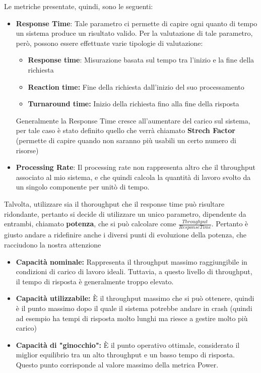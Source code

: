 Le metriche presentate, quindi, sono le seguenti:
\begin{itemize}
    \item \textbf{Response Time}: Tale parametro ci permette di capire ogni quanto di tempo un sistema produce un risultato valido. Per la valutazione di tale parametro, però, possono essere effettuate varie tipologie di valutazione:
    \begin{itemize}
        \item \textbf{Response time}: Misurazione basata sul tempo tra l'inizio e la fine della richiesta
            
        \item \textbf{Reaction time:} Fine della richiesta dall'inizio del suo processamento
        
        \item \textbf{Turnaround time:} Inizio della richiesta fino alla fine della risposta
    \end{itemize}

    Generalmente la Response Time cresce all'aumentare del carico sul sistema, per tale caso è stato definito quello che verrà chiamato \textbf{Strech Factor} (permette di capire quando non saranno più usabili un certo numero di risorse)

    \item \textbf{Processing Rate}: Il processing rate non rappresenta altro che il throughput associato al mio sistema, e che quindi calcola la quantità di lavoro svolto da un singolo componente per unitò di tempo.
\end{itemize}

Talvolta, utilizzare sia il thoroughput che il response time può risultare ridondante, pertanto si decide di utilizzare un unico parametro, dipendente da entrambi, chiamato \textbf{potenza}, che si può calcolare come \textbf{\(\frac{Throughput}{Response Time}\)}. Pertanto è giusto andare a ridefinire anche i diversi punti di evoluzione della potenza, che racciudono la nostra attenzione

\begin{itemize}
    \item \textbf{Capacità nominale:} Rappresenta il throughput massimo raggiungibile in condizioni di carico di lavoro ideali. Tuttavia, a questo livello di throughput, il tempo di risposta è generalmente troppo elevato.
    \item \textbf{Capacità utilizzabile:} È il throughput massimo che si può ottenere, quindi è il punto massimo dopo il quale il sistema potrebbe andare in crash (quindi ad esempio ha tempi di risposta molto lunghi ma riesce a gestire molto più carico)
    \item \textbf{Capacità di "ginocchio":} È il punto operativo ottimale, considerato il miglior equilibrio tra un alto throughput e un basso tempo di risposta. Questo punto corrisponde al valore massimo della metrica Power.
\end{itemize}

